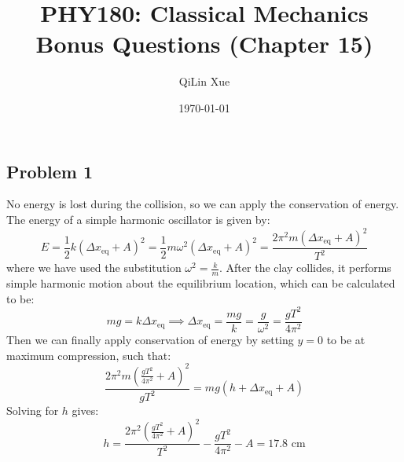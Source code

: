 \documentclass{article}
\title{PHY180: Classical Mechanics \\ Bonus Questions (Chapter 15)}
\author{QiLin Xue}
\date{\today}
\begin{document}
\maketitle
\subsection*{Problem 1}
No energy is lost during the collision, so we can apply the conservation of energy. The energy of a simple harmonic oscillator is given by:
\begin{equation}
    E = \frac{1}{2}k(\Delta x_\text{eq}+A)^2 = \frac{1}{2}m\omega^2 (\Delta x_\text{eq}+A)^2 = \frac{2\pi^2 m (\Delta x_\text{eq}+A)^2}{T^2}
    \label{eq:}
\end{equation}
where we have used the substitution $\omega^2 = \frac{k}{m}$. After the clay collides, it performs simple harmonic motion about the equilibrium location, which can be calculated to be:
\begin{equation}
    mg = k\Delta x_\text{eq} \implies \Delta x_\text{eq} = \frac{mg}{k}=\frac{g}{\omega^2}=\frac{gT^2}{4\pi^2}
    \label{eq:}
\end{equation}
Then we can finally apply conservation of energy by setting $y=0$ to be at maximum compression, such that:
\begin{equation}
    \frac{2\pi^2 m \left(\frac{gT^2}{4\pi^2}+A\right)^2}{gT^2} = mg\left(h+\Delta x_\text{eq}+A\right)
    \label{eq:}
\end{equation}
Solving for $h$ gives:
\begin{equation}
    h = \frac{2\pi^2 \left(\frac{gT^2}{4\pi^2}+A\right)^2}{T^2} - \frac{gT^2}{4\pi^2} - A = 17.8\text{ cm}
    \label{eq:}
\end{equation}
\end{document}
